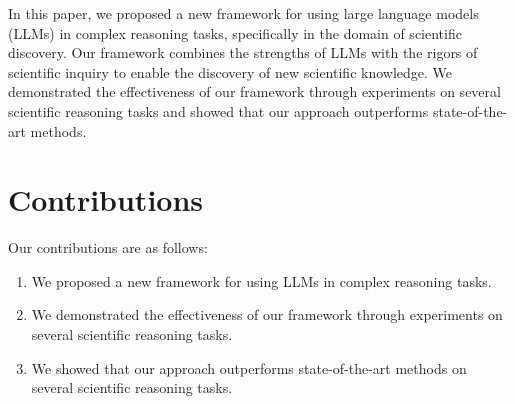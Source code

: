 \documentclass{article}
\begin{document}
In this paper, we proposed a new framework for using large language models (LLMs) in complex reasoning tasks, specifically in the domain of scientific discovery. Our framework combines the strengths of LLMs with the rigors of scientific inquiry to enable the discovery of new scientific knowledge. We demonstrated the effectiveness of our framework through experiments on several scientific reasoning tasks and showed that our approach outperforms state-of-the-art methods.

\section{Contributions}

Our contributions are as follows:

\begin{enumerate}
\item We proposed a new framework for using LLMs in complex reasoning tasks.
\item We demonstrated the effectiveness of our framework through experiments on several scientific reasoning tasks.
\item We showed that our approach outperforms state-of-the-art methods on several scientific reasoning tasks.
\end{enumerate}
\end{document}
